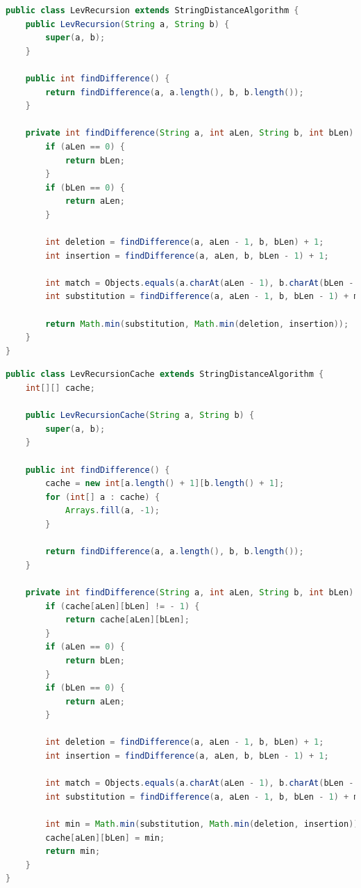 \documentclass[12pt]{report}
\begin{document}
    \begin{lstlisting}[label={code:levrecur},caption=Метод для нахождения расстояния Левенштейна рекурсивно,
        language=java]
public class LevRecursion extends StringDistanceAlgorithm {
    public LevRecursion(String a, String b) {
        super(a, b);
    }

    public int findDifference() {
        return findDifference(a, a.length(), b, b.length());
    }

    private int findDifference(String a, int aLen, String b, int bLen) {
        if (aLen == 0) {
            return bLen;
        }
        if (bLen == 0) {
            return aLen;
        }

        int deletion = findDifference(a, aLen - 1, b, bLen) + 1;
        int insertion = findDifference(a, aLen, b, bLen - 1) + 1;

        int match = Objects.equals(a.charAt(aLen - 1), b.charAt(bLen - 1)) ? 0 : 1;
        int substitution = findDifference(a, aLen - 1, b, bLen - 1) + match;

        return Math.min(substitution, Math.min(deletion, insertion));
    }
}
    \end{lstlisting}

    \begin{lstlisting}[label=code:levRecurMatrix,caption=Метод для нахождения расстояния Левенштейна рекурсивно
    \(\text{с матрицей}\),language=java]
public class LevRecursionCache extends StringDistanceAlgorithm {
    int[][] cache;

    public LevRecursionCache(String a, String b) {
        super(a, b);
    }

    public int findDifference() {
        cache = new int[a.length() + 1][b.length() + 1];
        for (int[] a : cache) {
            Arrays.fill(a, -1);
        }

        return findDifference(a, a.length(), b, b.length());
    }

    private int findDifference(String a, int aLen, String b, int bLen) {
        if (cache[aLen][bLen] != - 1) {
            return cache[aLen][bLen];
        }
        if (aLen == 0) {
            return bLen;
        }
        if (bLen == 0) {
            return aLen;
        }

        int deletion = findDifference(a, aLen - 1, b, bLen) + 1;
        int insertion = findDifference(a, aLen, b, bLen - 1) + 1;

        int match = Objects.equals(a.charAt(aLen - 1), b.charAt(bLen - 1)) ? 0 : 1;
        int substitution = findDifference(a, aLen - 1, b, bLen - 1) + match;

        int min = Math.min(substitution, Math.min(deletion, insertion));
        cache[aLen][bLen] = min;
        return min;
    }
}
    \end{lstlisting}
\end{document}
